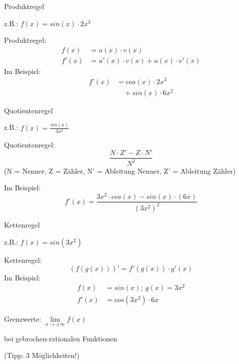 \documentclass[paper=a6,landscape,ngerman,twoside=true,fontsize=12pt]{scrartcl}
\begin{document}
\begin{frage}
	Produktregel
	
	z.B.: $f(x)=sin(x)\cdot2x^3$
	
\end{frage}
\begin{antwort}
	Produktregel:
	\begin{align*}
	f(x) &= u(x)\cdot v(x) \\
	f'(x)&=u'(x)\cdot v(x)+u(x)\cdot v'(x)
	\end{align*}
	Im Beispiel:
	\begin{align*}
	f'(x)&=cos(x)\cdot 2x^3 \\
	&\quad+ sin(x)\cdot 6x^2
	\end{align*}
\end{antwort}
\begin{frage}
	Quotientenregel
	
	z.B.: $f(x)=\frac{sin(x)}{3x^2}$
	
\end{frage}
\begin{antwort}
	Quotientenregel:
	\normalsize
	\[
	\frac{N \cdot Z' - Z \cdot N'}{N^2}
	\]
	\scriptsize (N = Nenner, Z = Zähler, N' = Ableitung Nenner, Z' = Ableitung Zähler)
	
	\Large
	Im Beispiel:
	\[
	f'(x)=\frac{3x^2 \cdot cos(x) - sin(x) \cdot (6x)}{(3x^2)^2}
	\]
\end{antwort}
\begin{frage}
	Kettenregel
	
	z.B.: $f(x)={sin(3x^2)}$
	
\end{frage}
\begin{antwort}
	Kettenregel:
	\[
	(f(g(x)))'=f'(g(x))\cdot g'(x)
	\]
	Im Beispiel:
	\begin{align*}
	f(x)&=sin(x);~ g(x)=3x^2 \\
	f'(x)&=cos(3x^2)\cdot 6x
	\end{align*}
\end{antwort}
\begin{frage}
	Grenzwerte: $\lim\limits_{x \rightarrow \pm\infty}{f(x)}$
	\bigskip
	
	bei gebrochen-rationalen Funktionen
	
	(Tipp: 3 Möglichkeiten!)
	
\end{frage}
\end{document}

